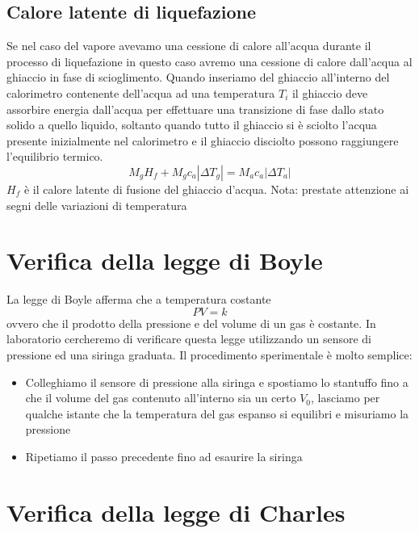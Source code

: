 \documentclass[a4paper,10pt,oneside]{article}
\begin{document}
\subsection{Calore latente di liquefazione}

Se nel caso del vapore avevamo una cessione di calore all'acqua durante il processo di liquefazione in questo caso avremo una cessione di calore dall'acqua al ghiaccio in fase di scioglimento. Quando inseriamo del ghiaccio all'interno del calorimetro contenente dell'acqua ad una temperatura $T_i$ il ghiaccio deve assorbire energia dall'acqua per effettuare una transizione di fase dallo stato solido a quello liquido, soltanto quando tutto il ghiaccio si è sciolto l'acqua presente inizialmente nel calorimetro e il ghiaccio disciolto possono raggiungere l'equilibrio termico.
\begin{equation}
 M_gH_f+M_gc_a|\Delta T_g|=M_ac_a|\Delta T_a|
\end{equation}
$H_f$ è il calore latente di fusione del ghiaccio d'acqua.
Nota: prestate attenzione ai segni delle variazioni di temperatura
\section{Verifica della legge di Boyle}

La legge di Boyle afferma che a temperatura costante
\begin{equation}
 PV=k
\end{equation}
ovvero che il prodotto della pressione e del volume di un gas è costante. In laboratorio cercheremo di verificare questa legge utilizzando un sensore di pressione ed una siringa graduata. Il procedimento sperimentale è molto semplice:
\begin{itemize}
 \item Colleghiamo il sensore di pressione alla siringa e spostiamo lo stantuffo fino a che il volume del gas contenuto all'interno sia un certo $V_0$, lasciamo per qualche istante che la temperatura del gas espanso si equilibri e misuriamo la pressione
\item Ripetiamo il passo precedente fino ad esaurire la siringa
\end{itemize}

\section{Verifica della legge di Charles}
\end{document}
